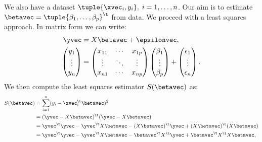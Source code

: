 We also have a dataset $\tuple{\xvec_i, y_i},\;i = 1, \dots, n$. Our aim is to estimate $\betavec = \tuple{\beta_1, \dots, \beta_p}^\t$ from data. We proceed with a least squares approach. In matrix form we can write:
\begin{equation}
    \begin{aligned}
        \yvec           & = X\betavec + \epsilonvec, \\
        \begin{pmatrix}
            y_1    \\
            \vdots \\
            y_n
        \end{pmatrix} & = \begin{pmatrix}
                              x_{11} & \cdots & x_{1p} \\
                              \vdots & \ddots & \vdots \\
                              x_{n1} & \cdots & x_{np}
                          \end{pmatrix}
        \begin{pmatrix}
            \beta_1 \\
            \vdots  \\
            \beta_p
        \end{pmatrix} + \begin{pmatrix}
                            \epsilon_1 \\
                            \vdots     \\
                            \epsilon_n
                        \end{pmatrix}.
    \end{aligned}
\end{equation}
We then compute the least squares estimator $S(\betavec)$ as:
\begin{equation}
    \begin{aligned}
        S(\betavec) & = \sum_{i=1}^n (y_i - \xvec_i^\t\betavec)^2                                                \\
                    & = (\yvec - X\betavec)^\t(\yvec - X\betavec)                                                \\
                    & = \yvec^\t\yvec - \yvec^\t X\betavec - (X\betavec)^\t\yvec + (X\betavec)^\t (X\betavec)    \\
                    & = \yvec^\t\yvec - \yvec^\t X\betavec - \betavec^\t X^\t\yvec + \betavec^\t X^\t X\betavec,
    \end{aligned}
\end{equation}
